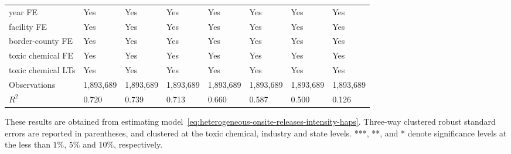 \begin{table}[H]
{\begin{tabular}{@{}llllllll@{}}
            year FE                         & Yes       & Yes           & Yes       & Yes          & Yes             & Yes           & Yes                 \\
            facility FE                     & Yes       & Yes           & Yes       & Yes          & Yes             & Yes           & Yes                 \\
            border-county FE                & Yes       & Yes           & Yes       & Yes          & Yes             & Yes           & Yes                 \\
            toxic chemical FE               & Yes       & Yes           & Yes       & Yes          & Yes             & Yes           & Yes                 \\
            toxic chemical LTs              & Yes       & Yes           & Yes       & Yes          & Yes             & Yes           & Yes                 \\\midrule
            Observations                    & 1,893,689 & 1,893,689     & 1,893,689 & 1,893,689    & 1,893,689       & 1,893,689     & 1,893,689           \\
            $R^2$                           & 0.720     & 0.739         & 0.713     & 0.660        & 0.587           & 0.500         & 0.126               \\ \bottomrule\bottomrule
        \end{tabular}%
    }
    \begin{minipage}{18cm}
        \vspace{0.05in}
        These results are obtained from estimating model~\ref{eq:heterogeneous-onsite-releases-intensity-haps}. Three-way clustered robust standard errors are reported in parentheses, and clustered at the toxic chemical, industry and state levels. ***, **, and * denote significance levels at the less than $1\%$, $5\%$ and $10\%$, respectively.
    \end{minipage}
\end{table}